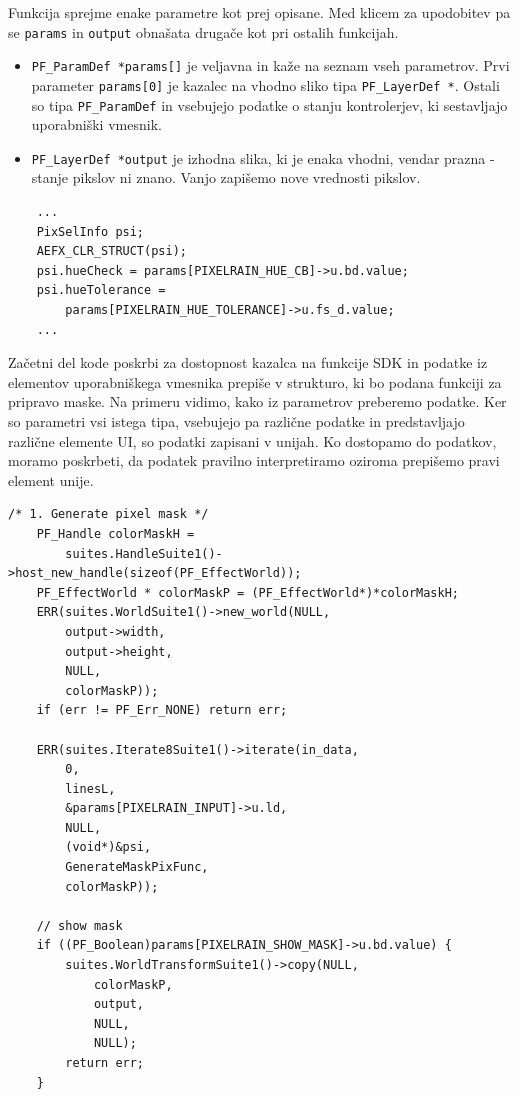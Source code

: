 \documentclass[a4paper, 12pt]{book}
\begin{document}
Funkcija sprejme enake parametre kot prej opisane.
Med klicem za upodobitev pa se \texttt{params} in \texttt{output} obnašata drugače kot pri ostalih funkcijah.
\begin{itemize}
\item{\texttt{PF\_ParamDef *params[]} je veljavna in kaže na seznam vseh parametrov. 
	Prvi parameter \texttt{params[0]} je kazalec na vhodno sliko tipa \texttt{PF\_LayerDef *}.
	Ostali so tipa \texttt{PF\_ParamDef} in vsebujejo podatke o stanju kontrolerjev, ki sestavljajo uporabniški vmesnik.}
\item{\texttt{PF\_LayerDef *output} je izhodna slika, ki je enaka vhodni, vendar prazna - stanje pikslov ni znano. 
	Vanjo zapišemo nove vrednosti pikslov.  }
\end{itemize}

\begin{verbatim}
    ...
    PixSelInfo psi;
    AEFX_CLR_STRUCT(psi);
    psi.hueCheck = params[PIXELRAIN_HUE_CB]->u.bd.value;
    psi.hueTolerance = 
        params[PIXELRAIN_HUE_TOLERANCE]->u.fs_d.value;
    ...
\end{verbatim}

Začetni del kode poskrbi za dostopnost kazalca na funkcije SDK in podatke iz elementov uporabniškega vmesnika prepiše v strukturo, 
ki bo podana funkciji za pripravo maske.
Na primeru vidimo, kako iz parametrov preberemo podatke.
Ker so parametri vsi istega tipa, vsebujejo pa različne podatke in predstavljajo različne elemente UI, so podatki zapisani v unijah.
Ko dostopamo do podatkov, moramo poskrbeti, da podatek pravilno interpretiramo oziroma prepišemo pravi element unije.

\begin{verbatim}
/* 1. Generate pixel mask */
    PF_Handle colorMaskH = 
        suites.HandleSuite1()->host_new_handle(sizeof(PF_EffectWorld));
    PF_EffectWorld * colorMaskP = (PF_EffectWorld*)*colorMaskH;
    ERR(suites.WorldSuite1()->new_world(NULL,
        output->width,
        output->height,
        NULL,
        colorMaskP));
    if (err != PF_Err_NONE) return err;
    
    ERR(suites.Iterate8Suite1()->iterate(in_data,
        0,                        
        linesL,                   
        &params[PIXELRAIN_INPUT]->u.ld, 
        NULL,                        
        (void*)&psi,        
        GenerateMaskPixFunc,  
        colorMaskP));
    
    // show mask
    if ((PF_Boolean)params[PIXELRAIN_SHOW_MASK]->u.bd.value) {
        suites.WorldTransformSuite1()->copy(NULL,
            colorMaskP,
            output,
            NULL,
            NULL);
        return err;
    }
\end{verbatim}
\end{document}

